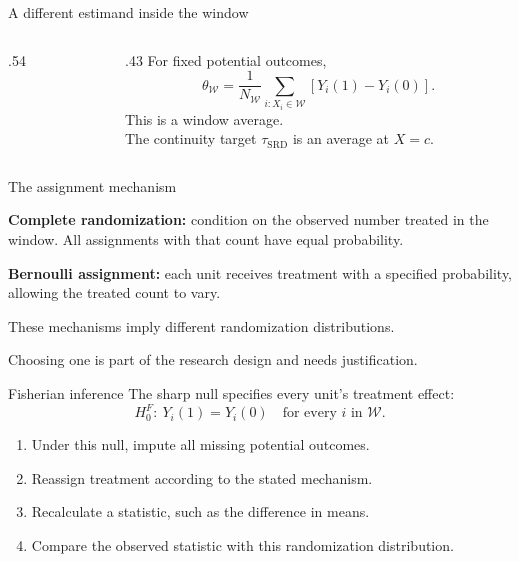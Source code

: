 \begin{frame}{A different estimand inside the window}
\begin{columns}
\begin{column}{.54\textwidth}\end{column}
\begin{column}{.43\textwidth}
For fixed potential outcomes,
\[
\theta_{\mathcal W}=\frac{1}{N_{\mathcal W}}
\sum_{i:X_i\in\mathcal W}[Y_i(1)-Y_i(0)].
\]
This is a window average.\\[.7em]
The continuity target $\tau_{\mathrm{SRD}}$ is an average at $X=c$.
\end{column}
\end{columns}
\end{frame}

\begin{frame}{The assignment mechanism}
\begin{items}
\item \textbf{Complete randomization:} condition on the observed number treated in the window. All assignments with that count have equal probability.
\item \textbf{Bernoulli assignment:} each unit receives treatment with a specified probability, allowing the treated count to vary.
\item These mechanisms imply different randomization distributions.
\item Choosing one is part of the research design and needs justification.
\end{items}
\end{frame}

\begin{frame}{Fisherian inference}
The sharp null specifies every unit's treatment effect:
\[
H_0^F:\ Y_i(1)=Y_i(0)\quad\text{for every }i\text{ in }\mathcal W.
\]
\begin{enumerate}\setlength{\itemsep}{.5em}
\item Under this null, impute all missing potential outcomes.
\item Reassign treatment according to the stated mechanism.
\item Recalculate a statistic, such as the difference in means.
\item Compare the observed statistic with this randomization distribution.
\end{enumerate}
\end{frame}

